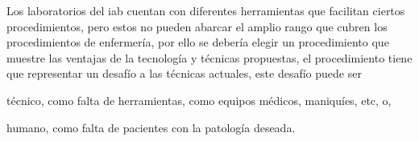 \begin{itemize}
    Los laboratorios del \Gls{iab} cuentan con diferentes herramientas que
    facilitan ciertos procedimientos, pero estos no pueden abarcar el amplio
    rango que cubren los procedimientos de enfermería, por ello se debería
    elegir un procedimiento que muestre las ventajas de la tecnología y técnicas
    propuestas, el procedimiento tiene que representar un desafío a las técnicas
    actuales, este desafío puede ser 
    \begin{enumerate*}[label=\itshape\alph*\upshape.]
    \item técnico, como falta de herramientas, como equipos médicos, maniquíes,
        etc, o,
    \item humano, como falta de pacientes con la patología deseada.
    \end{enumerate*}
    
\end{itemize}
